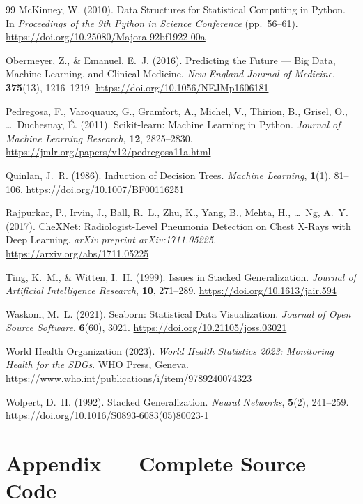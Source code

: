 \documentclass[12pt,a4paper]{article}
\begin{document}
\begin{thebibliography}{99}
McKinney, W. (2010).
Data Structures for Statistical Computing in Python.
In \textit{Proceedings of the 9th Python in Science Conference} (pp.\ 56--61).
\url{https://doi.org/10.25080/Majora-92bf1922-00a}

Obermeyer, Z., \& Emanuel, E.~J. (2016).
Predicting the Future --- Big Data, Machine Learning, and Clinical Medicine.
\textit{New England Journal of Medicine}, \textbf{375}(13), 1216--1219.
\url{https://doi.org/10.1056/NEJMp1606181}

Pedregosa, F., Varoquaux, G., Gramfort, A., Michel, V., Thirion, B., Grisel, O.,
\ldots\ Duchesnay, {\'E}. (2011).
Scikit-learn: Machine Learning in Python.
\textit{Journal of Machine Learning Research}, \textbf{12}, 2825--2830.
\url{https://jmlr.org/papers/v12/pedregosa11a.html}

Quinlan, J.~R. (1986).
Induction of Decision Trees.
\textit{Machine Learning}, \textbf{1}(1), 81--106.
\url{https://doi.org/10.1007/BF00116251}

Rajpurkar, P., Irvin, J., Ball, R.~L., Zhu, K., Yang, B., Mehta, H.,
\ldots\ Ng, A.~Y. (2017).
CheXNet: Radiologist-Level Pneumonia Detection on Chest X-Rays with Deep Learning.
\textit{arXiv preprint arXiv:1711.05225}.
\url{https://arxiv.org/abs/1711.05225}

Ting, K.~M., \& Witten, I.~H. (1999).
Issues in Stacked Generalization.
\textit{Journal of Artificial Intelligence Research}, \textbf{10}, 271--289.
\url{https://doi.org/10.1613/jair.594}

Waskom, M.~L. (2021).
Seaborn: Statistical Data Visualization.
\textit{Journal of Open Source Software}, \textbf{6}(60), 3021.
\url{https://doi.org/10.21105/joss.03021}

World Health Organization (2023).
\textit{World Health Statistics 2023: Monitoring Health for the SDGs}.
WHO Press, Geneva.
\url{https://www.who.int/publications/i/item/9789240074323}

Wolpert, D.~H. (1992).
Stacked Generalization.
\textit{Neural Networks}, \textbf{5}(2), 241--259.
\url{https://doi.org/10.1016/S0893-6083(05)80023-1}

\end{thebibliography}

\section{Appendix --- Complete Source Code}
\end{document}
